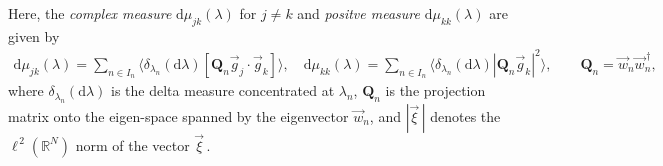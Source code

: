 \documentclass[11pt]{amsart}
\renewcommand{\d}{\mathrm{d}}
\newcommand{\Qb}{\mathbf{Q}}
\begin{document}
%
Here, the \emph{complex measure} $\d\mu_{jk}(\lambda)$ for $j\neq k$ and
\emph{positve measure} $\d\mu_{kk}(\lambda)$ are given by 
% 
\begin{align}
  \d\mu_{jk}(\lambda)=\sum_{n\in I_n}\langle\delta_{\lambda_n}(\d\lambda)[\Qb_n\vec{g}_j\cdot\vec{g}_k]\rangle, \quad  
  \d\mu_{kk}(\lambda)=\sum_{n\in I_n}\langle\delta_{\lambda_n}(\d\lambda)|\Qb_n\vec{g}_k|^2\rangle, \qquad
  \Qb_n=\vec{w}_n\vec{w}_n^{\,\dagger}, 
\end{align}
%
where $\delta_{\lambda_n}(\d\lambda)$ is the delta measure concentrated at $\lambda_n$,
$\Qb_n$ is the projection matrix onto the eigen-space spanned by the
eigenvector $\vec{w}_n$, and
$|\vec{\xi}\,|$ denotes the $\ell^{\,2}(\mathbb{R}^N)$ norm of the vector
$\vec{\xi}\,$.   
\end{document}
